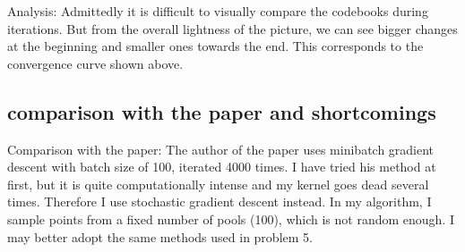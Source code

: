 \documentclass[11pt]{article}
\begin{document}
    Analysis: Admittedly it is difficult to visually compare the codebooks
during iterations. But from the overall lightness of the picture, we can
see bigger changes at the beginning and smaller ones towards the end.
This corresponds to the convergence curve shown above.

    \subsection{comparison with the paper and
shortcomings}\label{comparison-with-the-paper-and-shortcomings}

    Comparison with the paper: The author of the paper uses minibatch
gradient descent with batch size of 100, iterated 4000 times. I have
tried his method at first, but it is quite computationally intense and
my kernel goes dead several times. Therefore I use stochastic gradient
descent instead. In my algorithm, I sample points from a fixed number of
pools (100), which is not random enough. I may better adopt the same
methods used in problem 5.


    
    
    
    
\end{document}
